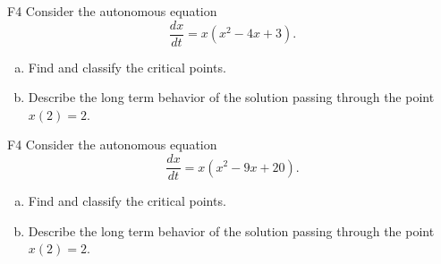\begin{problem}{F4}
Consider the autonomous equation
\[
\frac{dx}{dt} = x(x^2 - 4x + 3).
\]
\begin{enumerate}[(a)]
\item Find and classify the critical points.
\item Describe the long term behavior of the solution passing through the point \(x(2)=2\).
\end{enumerate}
\end{problem}

\begin{problem}{F4}
Consider the autonomous equation
\[
\frac{dx}{dt} = x(x^2 - 9x + 20).
\]
\begin{enumerate}[(a)]
\item Find and classify the critical points.
\item Describe the long term behavior of the solution passing through the point \(x(2)=2\).
\end{enumerate}
\end{problem}

